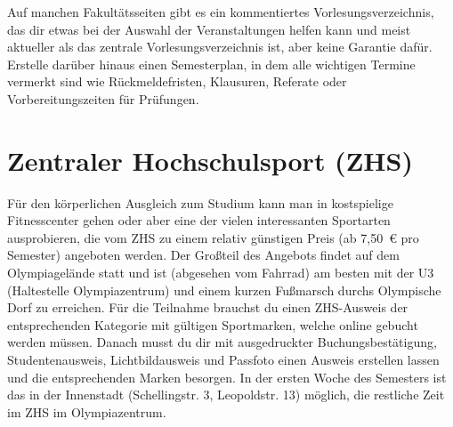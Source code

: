 Auf manchen Fakultätsseiten gibt es ein kommentiertes Vorlesungsverzeichnis, das dir etwas bei der Auswahl der Veranstaltungen helfen kann und meist aktueller als das zentrale Vorlesungsverzeichnis ist, aber keine Garantie dafür. Erstelle darüber hinaus einen Semesterplan, in dem alle wichtigen Termine vermerkt sind wie Rückmeldefristen, Klausuren, Referate oder Vorbereitungszeiten für Prüfungen.
	




\section{Zentraler Hochschulsport (ZHS)}

Für den körperlichen Ausgleich zum Studium kann man in kostspielige Fitnesscenter gehen oder aber eine der vielen interessanten Sportarten ausprobieren, die vom ZHS zu einem relativ günstigen Preis (ab 7,50~€ pro Semester) angeboten werden. Der Großteil des Angebots findet auf dem Olympiagelände statt und ist (abgesehen vom Fahrrad) am besten mit der U3 (Haltestelle Olympiazentrum) und einem kurzen Fußmarsch durchs Olympische Dorf zu erreichen. Für die Teilnahme brauchst du einen ZHS-Ausweis der entsprechenden Kategorie mit gültigen Sportmarken, welche online gebucht werden müssen. Danach musst du dir mit ausgedruckter Buchungsbestätigung, Studentenausweis, Lichtbildausweis und Passfoto einen Ausweis erstellen lassen und die entsprechenden Marken besorgen. In der ersten Woche des Semesters ist das in der Innenstadt (Schellingstr. 3, Leopoldstr. 13) möglich, die restliche Zeit im ZHS im Olympiazentrum. 

